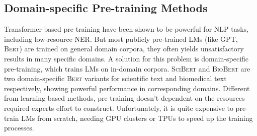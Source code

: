 \documentclass[10pt, conference, compsocconf]{IEEEtran}
\newcommand{\bert}{\textsc{Bert}\xspace}
\newcommand{\scibert}{\textsc{SciBert}\xspace}
\newcommand{\biobert}{\textsc{BioBert}\xspace}
\begin{document}


\subsection{Domain-specific Pre-training Methods}
Transformer-based pre-training
have been shown to be powerful for NLP tasks\cite{devlin2018bert,yang2019xlnet}, including low-resource NER.
But most publicly pre-trained LMs (like GPT, \bert) are trained on general domain corpora, 
they often yields unsatisfactory results in many specific domains. A solution for this problem is domain-specific pre-training,
which trains LMs on in-domain corpora.
\scibert\cite{beltagy-etal-2019-scibert} and \biobert\cite{lee2020biobert}
are two domain-specific \bert variants for scientific text and biomedical text respectively,
showing powerful performance in corresponding domains. 
Different from learning-based methods, pre-training doesn't dependent on
the resources required experts effort to construct. Unfortunately, 
it is quite expensive to pre-train LMs from scratch,
needing GPU clusters or TPUs to speed up the training processes. 





\end{document}
